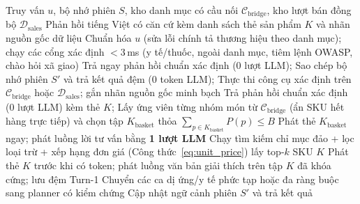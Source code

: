 \begin{algorithm}[htbp]
\caption{Định tuyến Lai Không Planner có Căn cứ (\emph{Zero-Planner Hybrid Routing}, \texttt{Retail-AI-})}
\label{alg:zero_planner_sse}
\footnotesize
\begin{algorithmic}[1]
\Require Truy vấn $u$, bộ nhớ phiên $S$, kho danh mục có cầu nối $\mathcal{C}_{\text{bridge}}$, kho lượt bán đồng bộ $\mathcal{D}_{\text{sales}}$
\Ensure Phản hồi tiếng Việt có căn cứ kèm danh sách thẻ sản phẩm $K$ và nhãn nguồn gốc dữ liệu
\State Chuẩn hóa $u$ (sửa lỗi chính tả thương hiệu theo danh mục); chạy các cổng xác định $<3$\,ms (y tế/thuốc, ngoài danh mục, tiêm lệnh OWASP, chào hỏi xã giao)
    \State Trả ngay phản hồi chuẩn xác định (0 lượt LLM); \Return
\EndIf
{}
    \State Sao chép bộ nhớ phiên $S'$ và trả kết quả đệm (0 token LLM); \Return
\EndIf
{}
    \State Thực thi công cụ xác định trên $\mathcal{C}_{\text{bridge}}$ hoặc $\mathcal{D}_{\text{sales}}$; gắn nhãn nguồn gốc minh bạch
    \State Trả phản hồi chuẩn xác định (0 lượt LLM) kèm thẻ $K$; \Return
\EndIf
{}
    \State Lấy ứng viên từng nhóm món từ $\mathcal{C}_{\text{bridge}}$ (ẩn SKU hết hàng trực tiếp) và chọn tập $K_{\text{basket}}$ thỏa $\sum_{p \in K_{\text{basket}}} P(p) \le B$
    \State Phát thẻ $K_{\text{basket}}$ ngay; phát luồng lời tư vấn bằng \textbf{1 lượt LLM}
    \State Chạy tìm kiếm chỉ mục đảo + lọc loại trừ + xếp hạng đơn giá (Công thức~\ref{eq:unit_price}) lấy top-$k$ SKU $K$
    \State Phát thẻ $K$ trước khi có token; phát luồng văn bản giải thích trên tập $K$ đã khóa cứng; lưu đệm Turn-1
\Else
    \State Chuyển các ca dị ứng/y tế phức tạp hoặc đa ràng buộc sang planner có kiểm chứng
\EndIf
\State Cập nhật ngữ cảnh phiên $S'$ và trả kết quả
\end{algorithmic}
\end{algorithm}

